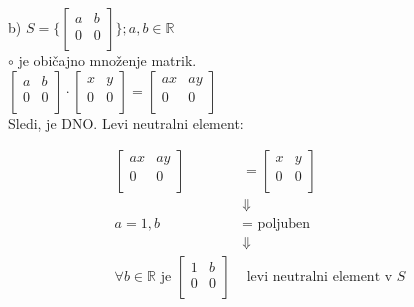 \documentclass[12pt]{article}
\begin{document}
\noindent
b) $S = \{
    \begin{bmatrix}
        a & b \\
        0 & 0 \\
    \end{bmatrix}
    \}; a, b \in \mathbb{R}$ \\
\hspace*{1em} $\circ$ je običajno množenje matrik. \\
\hspace*{1em} $
    \begin{bmatrix}
        a & b \\
        0 & 0 \\
    \end{bmatrix}
    \cdot
    \begin{bmatrix}
        x & y \\
        0 & 0 \\
    \end{bmatrix}
    =
    \begin{bmatrix}
        ax & ay \\
        0 & 0 \\
    \end{bmatrix}
$ \\
\hspace*{1em} Sledi, je DNO.
\hspace*{1em} Levi neutralni element:

\begin{align*}
    \begin{bmatrix}
        ax & ay \\
        0 & 0 \\
    \end{bmatrix}
    &= 
    \begin{bmatrix}
        x & y \\
        0 & 0 \\
    \end{bmatrix} \\
    &\Downarrow \\
    a = 1, b &= \text{ poljuben } \\
    &\Downarrow \\
    \forall b \in \mathbb{R} \text{ je }
    \begin{bmatrix}
        1 & b \\
        0 & 0 \\    
    \end{bmatrix} &
    \text{ levi neutralni element v } S
\end{align*} \\
\end{document}
